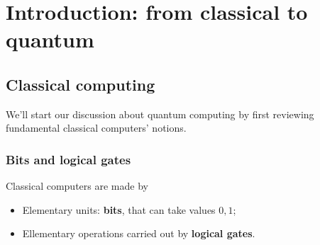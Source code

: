 \graphicspath{{chapters/01/}}
\chapter{Introduction: from classical to quantum}
\section{Classical computing}
We'll start our discussion about quantum computing by first reviewing fundamental classical computers' notions.
\subsection{Bits and logical gates}
Classical computers are made by 
\begin{itemize}
	\item Elementary units: \textbf{bits}, that can take values $0,1$;
	\item Ellementary operations carried out by \textbf{logical gates}.
\end{itemize}